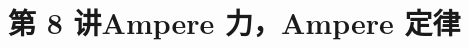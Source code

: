 \documentclass[UTF8,zihao=-4,oneside,openany]{ctexbook}
\begin{document}
\setcounter{page}{1}
\setcounter{equation}{0}

\section*{第 8 讲\quad Ampere 力，Ampere 定律}


\end{document}
